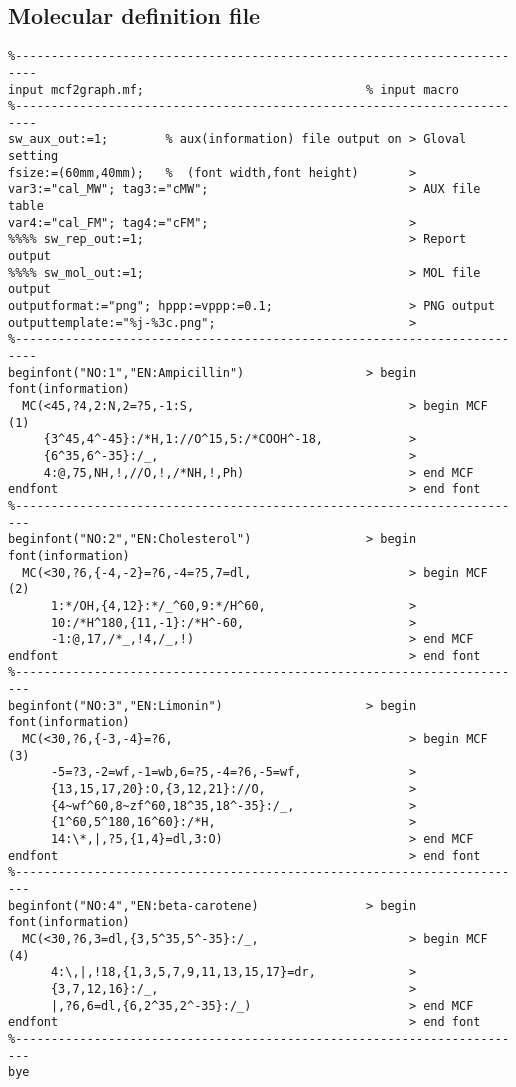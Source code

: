 \documentclass[a4paper]{article}
\begin{document}
\subsection{Molecular definition file}
\begin{verbatim}
%-------------------------------------------------------------------------
input mcf2graph.mf;                               % input macro
%-------------------------------------------------------------------------
sw_aux_out:=1;        % aux(information) file output on > Gloval setting
fsize:=(60mm,40mm);   %  (font width,font height)       >
var3:="cal_MW"; tag3:="cMW";                            > AUX file table
var4:="cal_FM"; tag4:="cFM";                            >
%%%% sw_rep_out:=1;                                     > Report output
%%%% sw_mol_out:=1;                                     > MOL file output
outputformat:="png"; hppp:=vppp:=0.1;                   > PNG output
outputtemplate:="%j-%3c.png";                           >
%-------------------------------------------------------------------------
beginfont("NO:1","EN:Ampicillin")                 > begin font(information)
  MC(<45,?4,2:N,2=?5,-1:S,                              > begin MCF (1)
     {3^45,4^-45}:/*H,1://O^15,5:/*COOH^-18,            >
     {6^35,6^-35}:/_,                                   >
     4:@,75,NH,!,//O,!,/*NH,!,Ph)                       > end MCF 
endfont                                                 > end font
%------------------------------------------------------------------------
beginfont("NO:2","EN:Cholesterol")                > begin font(information)
  MC(<30,?6,{-4,-2}=?6,-4=?5,7=dl,                      > begin MCF (2)
      1:*/OH,{4,12}:*/_^60,9:*/H^60,                    >
      10:/*H^180,{11,-1}:/*H^-60,                       >
      -1:@,17,/*_,!4,/_,!)                              > end MCF
endfont                                                 > end font
%------------------------------------------------------------------------
beginfont("NO:3","EN:Limonin")                    > begin font(information)
  MC(<30,?6,{-3,-4}=?6,                                 > begin MCF (3)
      -5=?3,-2=wf,-1=wb,6=?5,-4=?6,-5=wf,               >
      {13,15,17,20}:O,{3,12,21}://O,                    >
      {4~wf^60,8~zf^60,18^35,18^-35}:/_,                >
      {1^60,5^180,16^60}:/*H,                           >
      14:\*,|,?5,{1,4}=dl,3:O)                          > end MCF
endfont                                                 > end font
%------------------------------------------------------------------------
beginfont("NO:4","EN:beta-carotene)               > begin font(information)
  MC(<30,?6,3=dl,{3,5^35,5^-35}:/_,                     > begin MCF (4)
      4:\,|,!18,{1,3,5,7,9,11,13,15,17}=dr,             >
      {3,7,12,16}:/_,                                   >
      |,?6,6=dl,{6,2^35,2^-35}:/_)                      > end MCF
endfont                                                 > end font
%------------------------------------------------------------------------
bye
\end{verbatim}
\noindent%
\newpage
\end{document}
